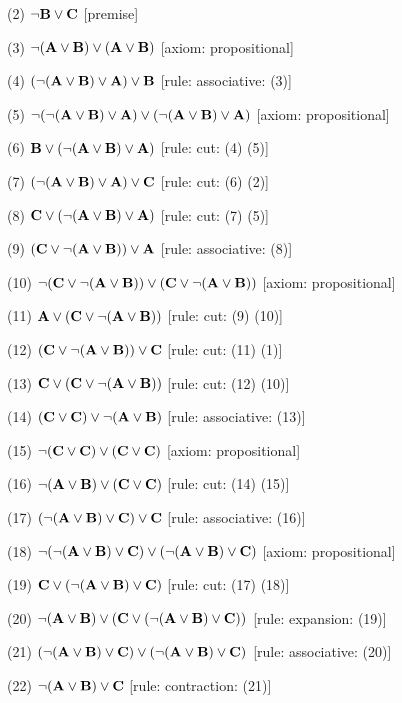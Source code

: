 \item{(2)} $\neg {\bf B} \lor {\bf C}$ \hfill [premise]
\item{(3)} $\neg ({\bf A} \lor {\bf B}) \lor ({\bf A} \lor {\bf B})$ \hfill [axiom: propositional]
\item{(4)} $(\neg ({\bf A} \lor {\bf B}) \lor {\bf A}) \lor {\bf B}$ \hfill [rule: associative: (3)]
\item{(5)} $\neg (\neg ({\bf A} \lor {\bf B}) \lor {\bf A}) \lor (\neg ({\bf A} \lor {\bf B}) \lor {\bf A})$ \hfill [axiom: propositional]
\item{(6)} ${\bf B} \lor (\neg ({\bf A} \lor {\bf B}) \lor {\bf A})$ \hfill [rule: cut: (4) (5)]
\item{(7)} $(\neg ({\bf A} \lor {\bf B}) \lor {\bf A}) \lor {\bf C}$ \hfill [rule: cut: (6) (2)]
\item{(8)} ${\bf C} \lor (\neg ({\bf A} \lor {\bf B}) \lor {\bf A})$ \hfill [rule: cut: (7) (5)]
\item{(9)} $({\bf C} \lor \neg ({\bf A} \lor {\bf B})) \lor {\bf A}$ \hfill [rule: associative: (8)]
\item{(10)} $\neg ({\bf C} \lor \neg ({\bf A} \lor {\bf B})) \lor ({\bf C} \lor \neg ({\bf A} \lor {\bf B}))$ \hfill [axiom: propositional]
\item{(11)} ${\bf A} \lor ({\bf C} \lor \neg ({\bf A} \lor {\bf B}))$ \hfill [rule: cut: (9) (10)]
\item{(12)} $({\bf C} \lor \neg ({\bf A} \lor {\bf B})) \lor {\bf C}$ \hfill [rule: cut: (11) (1)]
\item{(13)} ${\bf C} \lor ({\bf C} \lor \neg ({\bf A} \lor {\bf B}))$ \hfill [rule: cut: (12) (10)]
\item{(14)} $({\bf C} \lor {\bf C}) \lor \neg ({\bf A} \lor {\bf B})$ \hfill [rule: associative: (13)]
\item{(15)} $\neg ({\bf C} \lor {\bf C}) \lor ({\bf C} \lor {\bf C})$ \hfill [axiom: propositional]
\item{(16)} $\neg ({\bf A} \lor {\bf B}) \lor ({\bf C} \lor {\bf C})$ \hfill [rule: cut: (14) (15)]
\item{(17)} $(\neg ({\bf A} \lor {\bf B}) \lor {\bf C}) \lor {\bf C}$ \hfill [rule: associative: (16)]
\item{(18)} $\neg (\neg ({\bf A} \lor {\bf B}) \lor {\bf C}) \lor (\neg ({\bf A} \lor {\bf B}) \lor {\bf C})$ \hfill [axiom: propositional]
\item{(19)} ${\bf C} \lor (\neg ({\bf A} \lor {\bf B}) \lor {\bf C})$ \hfill [rule: cut: (17) (18)]
\item{(20)} $\neg ({\bf A} \lor {\bf B}) \lor ({\bf C} \lor (\neg ({\bf A} \lor {\bf B}) \lor {\bf C}))$ \hfill [rule: expansion: (19)]
\item{(21)} $(\neg ({\bf A} \lor {\bf B}) \lor {\bf C}) \lor (\neg ({\bf A} \lor {\bf B}) \lor {\bf C})$ \hfill [rule: associative: (20)]
\item{(22)} $\neg ({\bf A} \lor {\bf B}) \lor {\bf C}$ \hfill [rule: contraction: (21)]
